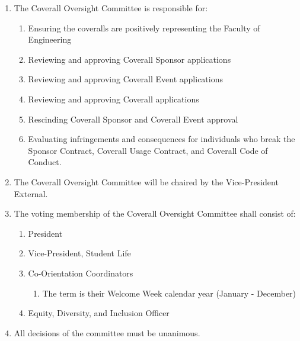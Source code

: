 \begin{enumerate}
 \item
  The Coverall Oversight Committee is responsible for:

  \begin{enumerate}
   \item
    Ensuring the coveralls are positively representing the Faculty of Engineering
   \item
    Reviewing and approving Coverall Sponsor applications
   \item
    Reviewing and approving Coverall Event applications
   \item
    Reviewing and approving Coverall applications
   \item
    Rescinding Coverall Sponsor and Coverall Event approval
   \item
    Evaluating infringements and consequences for individuals who break the Sponsor Contract, Coverall Usage Contract, and Coverall Code of Conduct.
  \end{enumerate}
 \item
  The Coverall Oversight Committee will be chaired by the Vice-President External.
 \item
  The voting membership of the Coverall Oversight Committee shall consist of:

  \begin{enumerate}
   \item
    President
   \item
    Vice-President, Student Life
   \item
    Co-Orientation Coordinators
    \begin{enumerate}
     \item
      The term is their Welcome Week calendar year (January - December)
    \end{enumerate}
   \item
    Equity, Diversity, and Inclusion Officer
  \end{enumerate}
 \item
  All decisions of the committee must be unanimous.
\end{enumerate}

